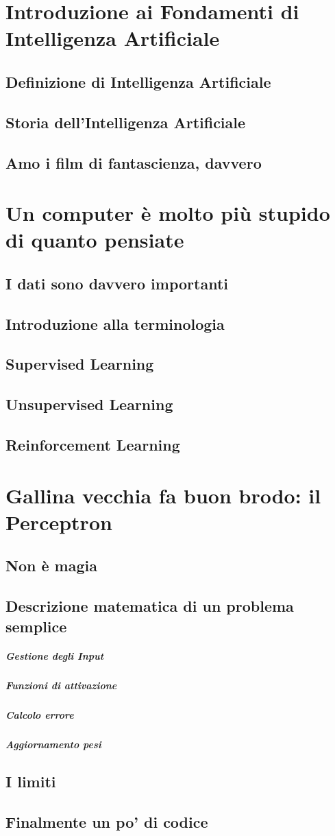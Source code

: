 \documentclass[a4paper]{article}
\begin{document}
\section{Introduzione ai Fondamenti di Intelligenza Artificiale}
\subsection{Definizione di Intelligenza Artificiale}
\subsection{Storia dell'Intelligenza Artificiale}
\subsection{Amo i film di fantascienza, davvero}

\section{Un computer è molto più stupido di quanto pensiate}
\subsection{I dati sono davvero importanti}
\subsection{Introduzione alla terminologia}
\subsection{Supervised Learning}
\subsection{Unsupervised Learning}
\subsection{Reinforcement Learning}

\section{Gallina vecchia fa buon brodo: il Perceptron}
\subsection{Non è magia}
\subsection{Descrizione matematica di un problema semplice}
\subparagraph{Gestione degli Input}
\subparagraph{Funzioni di attivazione}
\subparagraph{Calcolo errore}
\subparagraph{Aggiornamento pesi}
\subsection{I limiti}
\subsection{Finalmente un po' di codice}
\end{document}
